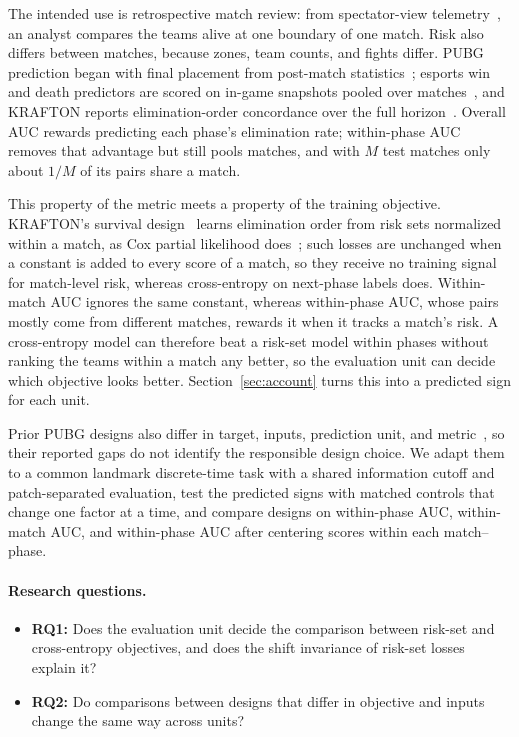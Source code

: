 \documentclass[sigconf,anonymous,nonacm]{acmart}
\begin{document}
The intended use is retrospective match review: from spectator-view telemetry~\cite{PUBGAPI,Zheng15}, an analyst compares the teams alive at one boundary of one match. Risk also differs between matches, because zones, team counts, and fights differ. PUBG prediction began with final placement from post-match statistics~\cite{KagglePUBG,LeeLee25}; esports win and death predictors are scored on in-game snapshots pooled over matches~\cite{Hodge21,Katona19,Marshall22}, and KRAFTON reports elimination-order concordance over the full horizon~\cite{KRAFTON}. Overall AUC rewards predicting each phase's elimination rate; within-phase AUC removes that advantage but still pools matches, and with $M$ test matches only about $1/M$ of its pairs share a match.

This property of the metric meets a property of the training objective. KRAFTON's survival design~\cite{KRAFTON} learns elimination order from risk sets normalized within a match, as Cox partial likelihood does~\cite{Cox72}; such losses are unchanged when a constant is added to every score of a match, so they receive no training signal for match-level risk, whereas cross-entropy on next-phase labels does. Within-match AUC ignores the same constant, whereas within-phase AUC, whose pairs mostly come from different matches, rewards it when it tracks a match's risk. A cross-entropy model can therefore beat a risk-set model within phases without ranking the teams within a match any better, so the evaluation unit can decide which objective looks better. Section~\ref{sec:account} turns this into a predicted sign for each unit.

Prior PUBG designs also differ in target, inputs, prediction unit, and metric~\cite{Sagong25a,KRAFTON}, so their reported gaps do not identify the responsible design choice. We adapt them to a common landmark discrete-time task with a shared information cutoff and patch-separated evaluation, test the predicted signs with matched controls that change one factor at a time, and compare designs on within-phase AUC, within-match AUC, and within-phase AUC after centering scores within each match--phase.

\paragraph{Research questions.}
\begin{itemize}
\item \textbf{RQ1:} Does the evaluation unit decide the comparison between risk-set and cross-entropy objectives, and does the shift invariance of risk-set losses explain it?
\item \textbf{RQ2:} Do comparisons between designs that differ in objective and inputs change the same way across units?
\end{itemize}
\end{document}
